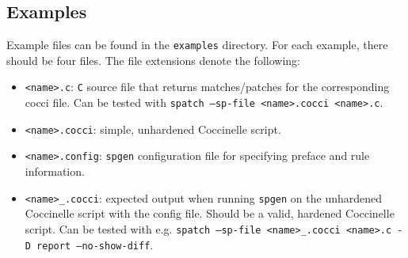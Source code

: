 \subsection{Examples}
Example files can be found in the \texttt{examples} directory. For each example, there should be four files. The file extensions denote the following:
\begin{itemize}
\item \texttt{<name>.c}: \texttt{C} source file that returns matches/patches for the corresponding cocci file. Can be tested with \texttt{spatch --sp-file <name>.cocci <name>.c}.
\item \texttt{<name>.cocci}: simple, unhardened Coccinelle script.
\item \texttt{<name>.config}: \texttt{spgen} configuration file for specifying preface and rule information.
\item \texttt{<name>\_.cocci}: expected output when running \texttt{spgen} on the unhardened Coccinelle script with the config file. Should be a valid, hardened Coccinelle script. Can be tested with e.g. \texttt{spatch --sp-file <name>\_.cocci <name>.c -D report --no-show-diff}.
\end{itemize}

